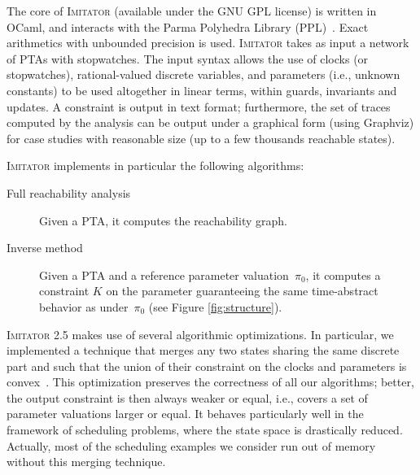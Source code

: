 \documentclass{llncs}
\newcommand{\pio}{\pi_0}
\newcommand{\IM}{\mathit{IM}}
\newcommand{\graphviz}{Graphviz}
\newcommand{\hytech}{{\sc HyTech}}
\newcommand{\imitator}{\textsc{Imitator}}
\begin{document}
The core of \imitator{} (available under the GNU GPL license) is written in OCaml, and interacts with the Parma Polyhedra Library (PPL)~\cite{bhz08}.
Exact arithmetics with unbounded precision is used.
% 
\imitator{} takes as input a network of PTAs with stopwatches.
The input syntax %
allows the use of clocks (or stopwatches), rational-valued discrete variables, and parameters (i.e., unknown constants) to be used altogether in linear terms, within guards, invariants and updates.
% 
A constraint is output in text format; furthermore, the set of traces computed by the analysis can be output under a graphical form (using \graphviz{}) for case studies with reasonable size (up to a few thousands reachable states).

\imitator{} implements in particular the following algorithms:
\begin{description}
	\item[Full reachability analysis] Given a PTA, it computes the reachability graph.
	\item[Inverse method] Given a PTA and a reference parameter valuation~$\pio$, it computes a constraint $K$ on the parameter guaranteeing the same time-abstract behavior as under~$\pio$ (see Figure \ref{fig:structure}).
\end{description}

\imitator{} 2.5 makes use of several algorithmic optimizations.
In particular, we implemented a technique that merges any two states sharing the same discrete part %
and such that the union of their constraint on the clocks and parameters is convex~\cite{AFS12}.
This optimization preserves the correctness of all our algorithms; better, the output constraint 
is then always weaker or equal, i.e., covers a set of parameter valuations larger or equal.
It behaves particularly well in the framework of scheduling problems, where the state space is drastically reduced.
Actually, most of the scheduling examples we consider run out of memory without this merging technique.




\end{document}
